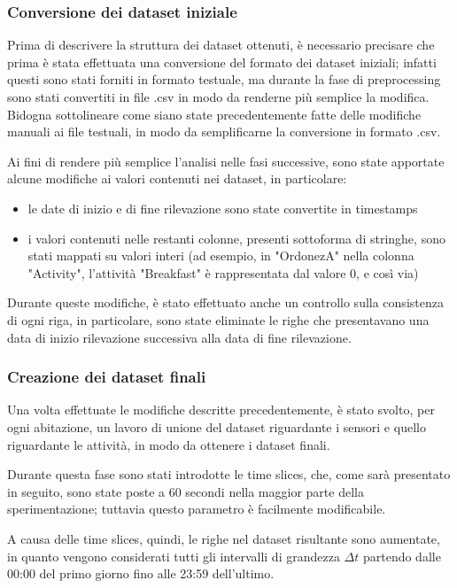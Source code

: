\documentclass[10pt,a4paper]{article}
\begin{document}
	\subsubsection{Conversione dei dataset iniziale}
	Prima di descrivere la struttura dei dataset ottenuti, è necessario precisare che prima è stata effettuata una conversione del formato dei dataset iniziali; infatti questi sono stati forniti in formato testuale, ma durante la fase di preprocessing sono stati convertiti in file .csv in modo da renderne più semplice la modifica. Bidogna sottolineare come siano state precedentemente fatte delle modifiche manuali ai file testuali, in modo da semplificarne la conversione in formato .csv.
	
	Ai fini di rendere più semplice l'analisi nelle fasi successive, sono state apportate alcune modifiche ai valori contenuti nei dataset, in particolare:
	\begin{itemize}
		\item le date di inizio e di fine rilevazione sono state convertite in timestamps
		\item i valori contenuti nelle restanti colonne, presenti sottoforma di stringhe, sono stati mappati su valori interi
		(ad esempio, in "OrdonezA" nella colonna "Activity", l'attività "Breakfast" è rappresentata dal valore 0, e così via)
	\end{itemize}
	
	Durante queste modifiche, è stato effettuato anche un controllo sulla consistenza di ogni riga, in particolare, sono state eliminate le righe che presentavano una data di inizio rilevazione successiva alla data di fine rilevazione.
	
	\subsubsection{Creazione dei dataset finali}
	Una volta effettuate le modifiche descritte precedentemente, è stato svolto, per ogni abitazione, un lavoro di unione del dataset riguardante i sensori e quello riguardante le attività, in modo da ottenere i dataset finali.
	
	Durante questa fase sono stati introdotte le time slices, che, come sarà presentato in seguito, sono state poste a 60 secondi nella maggior parte della sperimentazione; tuttavia questo parametro è facilmente modificabile.
	
	A causa delle time slices, quindi, le righe nel dataset risultante sono aumentate, in quanto vengono considerati tutti gli intervalli di grandezza $ \Delta t $ partendo dalle 00:00 del primo giorno fino alle 23:59 dell'ultimo.
	
\end{document}
